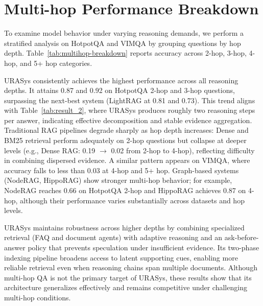 \documentclass[11pt]{article}
\begin{document}
\section{Multi-hop Performance Breakdown}

To examine model behavior under varying reasoning demands, we perform a stratified analysis on HotpotQA and VIMQA by grouping questions by hop depth. Table~\ref{tab:multihop-breakdown} reports accuracy across 2-hop, 3-hop, 4-hop, and 5+ hop categories.

URASys consistently achieves the highest performance across all reasoning depths. It attains 0.87 and 0.92 on HotpotQA 2-hop and 3-hop questions, surpassing the next-best system (LightRAG at 0.81 and 0.73). This trend aligns with Table~\ref{tab:result_2}, where URASys produces roughly two reasoning steps per answer, indicating effective decomposition and stable evidence aggregation. Traditional RAG pipelines degrade sharply as hop depth increases: Dense and BM25 retrieval perform adequately on 2-hop questions but collapse at deeper levels (e.g., Dense RAG: 0.19 $\to$ 0.02 from 2-hop to 4-hop), reflecting difficulty in combining dispersed evidence. A similar pattern appears on VIMQA, where accuracy falls to less than 0.03 at 4-hop and 5+ hop. Graph-based systems (NodeRAG, HippoRAG) show stronger multi-hop behavior; for example, NodeRAG reaches 0.66 on HotpotQA 2-hop and HippoRAG achieves 0.87 on 4-hop, although their performance varies substantially across datasets and hop levels.

URASys maintains robustness across higher depths by combining specialized retrieval (FAQ and document agents) with adaptive reasoning and an ask-before-answer policy that prevents speculation under insufficient evidence. Its two-phase indexing pipeline broadens access to latent supporting cues, enabling more reliable retrieval even when reasoning chains span multiple documents. Although multi-hop QA is not the primary target of URASys, these results show that its architecture generalizes effectively and remains competitive under challenging multi-hop conditions.
\end{document}
